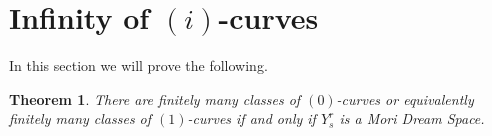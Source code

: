 \documentclass[12pt]{article}
\newtheorem{theorem}[equation]{Theorem}
\newtheorem{corollary}[equation]{Corollary}
\numberwithin{equation}{section}
\numberwithin{subeq}{equation}
\def\bbP{\mathbb{P}}
\begin{document}

\section{Infinity of $(i)$-curves}\label{infinite}

In this section we will prove the following.

\begin{theorem}\label{nms2}
There are finitely many classes of $(0)$-curves or equivalently finitely many classes of $(1)$-curves if and only if 
$Y^r_s$ is a Mori Dream Space.
\end{theorem}
\end{document}
